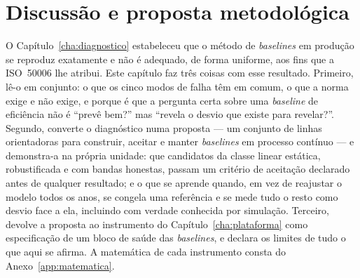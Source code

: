 
\chapter{Discussão e proposta metodológica}
\label{cha:discussao}

O Capítulo~\ref{cha:diagnostico} estabeleceu que o método de \emph{baselines}
em produção se reproduz exatamente e não é adequado, de forma uniforme, aos
fins que a ISO~50006 lhe atribui. Este capítulo faz três coisas com esse
resultado. Primeiro, lê-o em conjunto: o que os cinco modos de falha têm em
comum, o que a norma exige e não exige, e porque é que a pergunta certa
sobre uma \emph{baseline} de eficiência não é ``prevê bem?'' mas ``revela o
desvio que existe para revelar?''. Segundo, converte o diagnóstico numa
proposta --- um conjunto de linhas orientadoras para construir, aceitar e
manter \emph{baselines} em processo contínuo --- e demonstra-a na própria
unidade: que candidatos da classe linear estática, robustificada e com
bandas honestas, passam um critério de aceitação declarado antes de
qualquer resultado; e o que se aprende quando, em vez de reajustar o modelo
todos os anos, se congela uma referência e se mede tudo o resto como desvio
face a ela, incluindo com verdade conhecida por simulação. Terceiro,
devolve a proposta ao instrumento do Capítulo~\ref{cha:plataforma} como
especificação de um bloco de saúde das \emph{baselines}, e declara os
limites de tudo o que aqui se afirma. A matemática de cada instrumento
consta do Anexo~\ref{app:matematica}.

